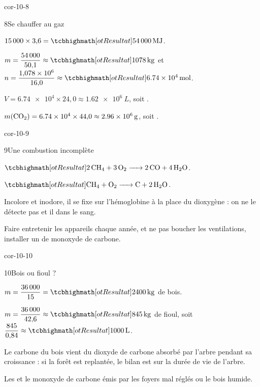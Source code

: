 \begin{blocLivre}{cor-10-8}
\begin{corrige}{8}{Se chauffer au gaz}
\begin{questions}
\item $15\,000\times3{,}6=\res{\qty{54000}{MJ}}$.
\item $m=\dfrac{54\,000}{50{,}1}\approx\res{\qty{1078}{kg}}$ et $n=\dfrac{1{,}078\times10^{6}}{16{,}0}\approx\res{\qty{6,74e4}{mol}}$.
\item $V=\num{6.74e4}\times24{,}0\approx\qty{1,62e6}{L}$, soit .
\item $m(\ce{CO2})=\num{6.74e4}\times44{,}0\approx\qty{2,96e6}{g}$, soit .
\end{questions}
\end{corrige}
\end{blocLivre}
\begin{blocLivre}{cor-10-9}
\begin{corrige}{9}{Une combustion incomplète}
\begin{questions}
\item $\res{\ce{2CH4 + 3O2 -> 2CO + 4H2O}}$.
\item $\res{\ce{CH4 + O2 -> C + 2H2O}}$.
\item Incolore et inodore, il se fixe sur l'hémoglobine à la place du dioxygène : on ne le détecte pas et il
 dans le sang.
\item Faire entretenir les appareils chaque année,  et ne pas boucher les ventilations, installer un  de
monoxyde de carbone.
\end{questions}
\end{corrige}
\end{blocLivre}
\begin{blocLivre}{cor-10-10}
\begin{corrige}{10}{Bois ou fioul ?}
\begin{questions}
\item $m=\dfrac{36\,000}{15}=\res{\qty{2400}{kg}}$ de bois.
\item $m=\dfrac{36\,000}{42{,}6}\approx\res{\qty{845}{kg}}$ de fioul, soit $\dfrac{845}{0{,}84}\approx\res{\qty{1000}{L}}$.
\item Le carbone du bois vient du dioxyde de carbone absorbé par l'arbre pendant sa croissance : si la forêt est
replantée, le bilan est  sur la durée de vie de l'arbre.
\item Les  et le monoxyde de carbone émis par les foyers mal réglés ou le bois humide.
\end{questions}
\end{corrige}
\end{blocLivre}
